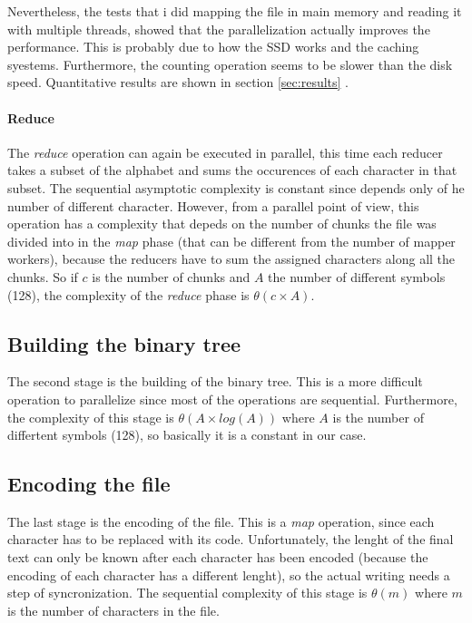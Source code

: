 \documentclass[12pt, letterpaper]{article}  %
\begin{document}
Nevertheless, the tests that i did mapping the file in main memory and reading it with multiple threads, showed that the parallelization
actually improves the performance. This is probably due to how the SSD works and the caching syestems. Furthermore, the 
counting operation seems to be slower than the disk speed. Quantitative results 
are shown in section \ref{sec:results} .

\paragraph*{Reduce}
The \textit{reduce} operation can again be executed in parallel, this 
time each reducer takes a subset of the alphabet and sums the occurences of each character in that subset. The sequential
asymptotic complexity is constant since depends only of he number of different character. However, from a parallel point of view, this operation 
has a complexity that depeds on the number of chunks the file was divided into in the \textit{map} phase (that can be different from the number of
mapper workers), because the reducers have to sum the assigned characters along all the chunks. So if $c$ is the number of chunks and $A$ the number
of different symbols (128), the complexity of the \textit{reduce} phase is $\theta(c \times A)$.

\subsection{Building the binary tree}
The second stage is the building of the binary tree. This is a more difficult operation to parallelize since 
most of the operations are sequential. Furthermore, the complexity of this stage is $\theta(A \times log (A))$  where 
$A$ is the number of differtent symbols (128), so basically it is a constant in our case.

\subsection{Encoding the file}
The last stage is the encoding of the file. This is a \textit{map} operation, since each character has to be replaced with its code.
Unfortunately, the lenght of the final text can only be known after each character has been encoded (because the encoding of each character
has a different lenght), so the actual writing needs a step of syncronization. The sequential complexity of this stage is $\theta(m)$ where $m$ is 
the number of characters in the file.
\end{document}
